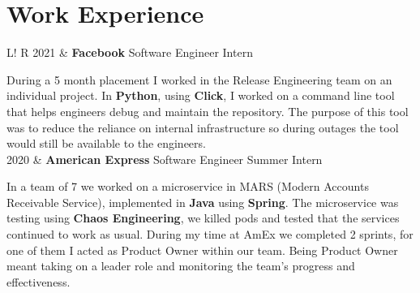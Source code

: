 \documentclass[10pt, a4paper]{article}
\newcommand\vsep{\color{lightgray} \vrule width 0.5pt}
\newcommand\sect[1]{\section*{\hspace{.05cm} \Large\sc #1}}
\newcommand\tspace{\hfill}
\begin{document}
        \sect{Work Experience}
            \begin{tabular}{L!{\vsep}R}
                2021 & {\textbf{Facebook}} \tspace Software Engineer Intern
                    \smallskip

                    During a 5 month placement I worked in the Release Engineering team on an individual project. In \textbf{Python}, using \textbf{Click}, I worked on a command line tool that helps engineers debug and maintain the repository. The purpose of this tool was to reduce the reliance on internal infrastructure so during outages the tool would still be available to the engineers. 
                \\
                2020 & {\textbf{American Express}} \tspace Software Engineer Summer Intern 
                    \smallskip

                    In a team of 7 we worked on a microservice in MARS (Modern Accounts Receivable Service), implemented in \textbf{Java} using \textbf{Spring}. The microservice was testing using \textbf{Chaos Engineering}, we killed pods and tested that the services continued to work as usual. During my time at AmEx we completed 2 sprints, for one of them I acted as Product Owner within our team. Being Product Owner meant taking on a leader role and monitoring the team's progress and effectiveness. 
                    \smallskip
            \end{tabular}
            \vspace{0.5\baselineskip}
\end{document}

